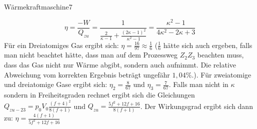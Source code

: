 \begin{problem}{Wärmekraftmaschine}{7}
\begin{solution}
$$\eta=\frac{-W}{Q_{zu}}=\frac 1{\frac 2{\kappa - 1}+\frac{(2\kappa-1)^2}{\kappa^2-1}}=\frac{\kappa^2-1}{4\kappa^2-2\kappa+3}$$
Für ein Dreiatomiges Gas ergibt sich: $\eta=\frac {16}{97}\approx \frac 16$ ($\frac 16$ hätte sich auch ergeben, falls man nicht beachtet hätte, dass man auf dem Prozessweg $Z_2Z_3$ beachten muss, dass das Gas nicht nur Wärme abgibt, sondern auch aufnimmt. Die relative Abweichung vom korrekten Ergebnis beträgt ungefähr $1,04\%$.).
Für zweiatomige und dreiatomige Gase ergibt sich: $\eta_2=\frac 8{67}$ und $\eta_3=\frac 7{67}$.
Falls man nicht in $\kappa$ sondern in Freiheitsgraden rechnet ergibt sich die Gleichungen $Q_{zu-23}=p_0V_0\frac{(f+4)^2}{8(f+1)}$ und $Q_{zu}=\frac{5f^2+12f+16}{8(f+1)}$. Der Wirkungsgrad ergibt sich dann zu: $\eta=\frac{4(f+1)}{5f^2+12f+16}$

\end{solution}
\end{problem}

